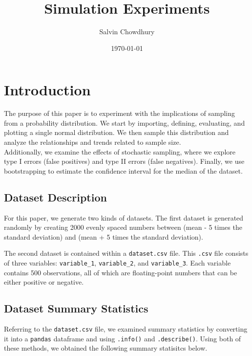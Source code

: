 \documentclass[a4paper,twocolumn]{article}
\title{Simulation Experiments}
\author{Salvin Chowdhury}
\date{\today}
\begin{document}
\setlength{\intextsep}{0pt} 
\setlength{\textfloatsep}{5pt} 

\maketitle
\onecolumn
\tableofcontents
\newpage

\twocolumn


\section{Introduction}
The purpose of this paper is to experiment with the implications of sampling from a probability distribution. 
We start by importing, defining, evaluating, and plotting a single normal distribution. We then sample this 
distribution and analyze the relationships and trends related to sample size. \\

Additionally, we examine the effects of stochastic sampling, where we explore type I errors (false positives) and
 type II errors (false negatives). Finally, we use bootstrapping to estimate the confidence interval for the median 
 of the dataset. \\


\subsection{Dataset Description}
For this paper, we generate two kinds of datasets. The first dataset is generated randomly by creating 2000 evenly 
spaced numbers between (mean - 5 times the standard deviation) and (mean + 5 times the standard deviation). 

The second dataset is contained within a \texttt{dataset.csv} file. This \texttt{.csv} file consists of three 
variables: \texttt{variable\_1}, \texttt{variable\_2}, and \texttt{variable\_3}. Each variable contains 500 
observations, all of which are floating-point numbers that can be either positive or negative.

\subsection{Dataset Summary Statistics}
Referring to the \texttt{dataset.csv} file, we examined summary statistics by converting it into a \texttt{pandas}
dataframe and using \texttt{.info()} and \texttt{.describe()}. Using both of these methods, we obtained the 
following summary statisitcs below. \\
\end{document}
